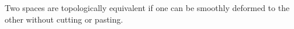 \documentclass[preview]{standalone}
\begin{document}
\begin{center}
Two spaces are topologically equivalent if one can be smoothly deformed to the other without cutting or pasting.
\end{center}
\end{document}
